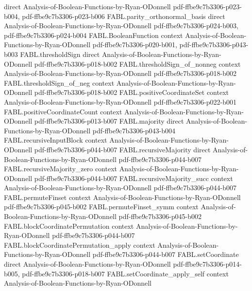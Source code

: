 \begin{theorem}
  {direct}
  {Analysis-of-Boolean-Functions-by-Ryan-ODonnell}
  {pdf-ffbe9c7b3306-p023-b004,
    pdf-ffbe9c7b3306-p023-b006}
\proofstep
  {FABL.parity_orthonormal_basis}
  {direct}
  {Analysis-of-Boolean-Functions-by-Ryan-ODonnell}
  {pdf-ffbe9c7b3306-p024-b003,
    pdf-ffbe9c7b3306-p024-b004}
\proofstep
  {FABL.BooleanFunction}
  {context}
  {Analysis-of-Boolean-Functions-by-Ryan-ODonnell}
  {pdf-ffbe9c7b3306-p020-b001,
    pdf-ffbe9c7b3306-p043-b003}
\proofstep
  {FABL.thresholdSign}
  {direct}
  {Analysis-of-Boolean-Functions-by-Ryan-ODonnell}
  {pdf-ffbe9c7b3306-p018-b002}
\proofstep
  {FABL.thresholdSign_of_nonneg}
  {context}
  {Analysis-of-Boolean-Functions-by-Ryan-ODonnell}
  {pdf-ffbe9c7b3306-p018-b002}
\proofstep
  {FABL.thresholdSign_of_neg}
  {context}
  {Analysis-of-Boolean-Functions-by-Ryan-ODonnell}
  {pdf-ffbe9c7b3306-p018-b002}
\proofstep
  {FABL.positiveCoordinateSet}
  {context}
  {Analysis-of-Boolean-Functions-by-Ryan-ODonnell}
  {pdf-ffbe9c7b3306-p022-b001}
\proofstep
  {FABL.positiveCoordinateCount}
  {context}
  {Analysis-of-Boolean-Functions-by-Ryan-ODonnell}
  {pdf-ffbe9c7b3306-p013-b007}
\proofstep
  {FABL.majority}
  {direct}
  {Analysis-of-Boolean-Functions-by-Ryan-ODonnell}
  {pdf-ffbe9c7b3306-p043-b004}
\proofstep
  {FABL.recursiveInputBlock}
  {context}
  {Analysis-of-Boolean-Functions-by-Ryan-ODonnell}
  {pdf-ffbe9c7b3306-p044-b007}
\proofstep
  {FABL.recursiveMajority}
  {direct}
  {Analysis-of-Boolean-Functions-by-Ryan-ODonnell}
  {pdf-ffbe9c7b3306-p044-b007}
\proofstep
  {FABL.recursiveMajority_zero}
  {context}
  {Analysis-of-Boolean-Functions-by-Ryan-ODonnell}
  {pdf-ffbe9c7b3306-p044-b007}
\proofstep
  {FABL.recursiveMajority_succ}
  {context}
  {Analysis-of-Boolean-Functions-by-Ryan-ODonnell}
  {pdf-ffbe9c7b3306-p044-b007}
\proofstep
  {FABL.permuteFinset}
  {context}
  {Analysis-of-Boolean-Functions-by-Ryan-ODonnell}
  {pdf-ffbe9c7b3306-p045-b002}
\proofstep
  {FABL.permuteFinset_symm}
  {context}
  {Analysis-of-Boolean-Functions-by-Ryan-ODonnell}
  {pdf-ffbe9c7b3306-p045-b002}
\proofstep
  {FABL.blockCoordinatePermutation}
  {context}
  {Analysis-of-Boolean-Functions-by-Ryan-ODonnell}
  {pdf-ffbe9c7b3306-p044-b007}
\proofstep
  {FABL.blockCoordinatePermutation_apply}
  {context}
  {Analysis-of-Boolean-Functions-by-Ryan-ODonnell}
  {pdf-ffbe9c7b3306-p044-b007}
\proofstep
  {FABL.setCoordinate}
  {direct}
  {Analysis-of-Boolean-Functions-by-Ryan-ODonnell}
  {pdf-ffbe9c7b3306-p014-b005,
    pdf-ffbe9c7b3306-p018-b007}
\proofstep
  {FABL.setCoordinate_apply_self}
  {context}
  {Analysis-of-Boolean-Functions-by-Ryan-ODonnell}

\end{theorem}
